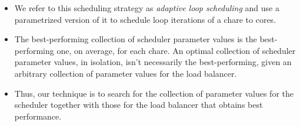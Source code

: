 
\begin{frame} 

\begin{itemize} 
\item We refer to this scheduling strategy as \emph{adaptive loop scheduling} and use a parametrized version of it to schedule loop iterations of a chare to cores. 
\item The best-performing collection of scheduler parameter values is the best-performing one, on average, for each chare. An optimal collection of scheduler parameter values, in isolation, isn't necessarily the best-performing, given an arbitrary collection of parameter values for the load balancer. 
\item Thus, our technique is to search for the collection of parameter values for the scheduler together with those for the load balancer that obtains best performance.
\end{itemize} 

\end{frame} 


